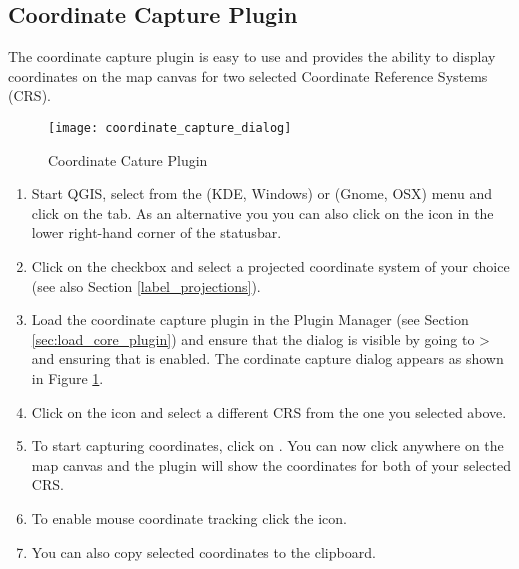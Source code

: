 
\subsection{Coordinate Capture Plugin}


The coordinate capture plugin is easy to use and provides the 
ability to display coordinates on the map canvas for two 
selected Coordinate Reference Systems (CRS).

\begin{figure}[ht]
   \begin{center}
   \caption{Coordinate Cature Plugin \nixcaption}\label{fig:coordinate_capture_dialog}\smallskip
   \texttt{[image: coordinate\_capture\_dialog]}
\end{center}  
\end{figure}

\begin{enumerate}
  \item Start QGIS, select  from 
  the  (KDE, Windows) or  (Gnome, OSX) menu 
  and click on the  tab. As an alternative you 
  you can also click on the  icon in the lower 
  right-hand corner of the statusbar.
  \item Click on the  checkbox and select a projected 
  coordinate system of your choice (see also Section \ref{label_projections}).
  \item Load the coordinate capture plugin in the Plugin Manager (see Section 
  \ref{sec:load_core_plugin}) and ensure that the dialog is visible by going to 
   >  and ensuring that  is enabled. 
   The cordinate capture dialog appears as shown in Figure \ref{fig:coordinate_capture_dialog}.
  \item Click on the  
  icon and select a different CRS from the one you selected above.
  \item To start capturing coordinates, click on . You can now click anywhere 
  on the map canvas and the plugin will show the coordinates for both of your selected CRS.
  \item To enable mouse coordinate tracking click the  icon.
  \item You can also copy selected coordinates to the clipboard.
\end{enumerate}

\newpage



